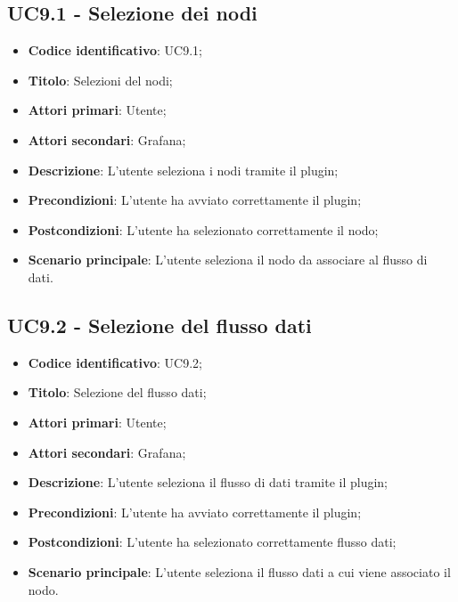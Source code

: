 \subsection{UC9.1 - Selezione dei nodi}
\begin{itemize}
	\item \textbf{Codice identificativo}: UC9.1;
	\item \textbf{Titolo}: Selezioni del nodi;
	\item \textbf{Attori primari}: Utente;
	\item \textbf{Attori secondari}: Grafana\glo;
	\item \textbf{Descrizione}: L'utente seleziona i nodi tramite il plugin;
	\item \textbf{Precondizioni}: L'utente ha avviato correttamente il plugin;
	\item \textbf{Postcondizioni}: L'utente ha selezionato correttamente il nodo;
	\item \textbf{Scenario principale}: L'utente seleziona il nodo da associare al flusso di dati.
\end{itemize}

\subsection{UC9.2 - Selezione del flusso dati}
\begin{itemize}
	\item \textbf{Codice identificativo}: UC9.2;
	\item \textbf{Titolo}: Selezione del flusso dati;
	\item \textbf{Attori primari}: Utente;
	\item \textbf{Attori secondari}: Grafana\glo;
	\item \textbf{Descrizione}: L'utente seleziona il flusso di dati tramite il plugin;
	\item \textbf{Precondizioni}: L'utente ha avviato correttamente il plugin;
	\item \textbf{Postcondizioni}: L'utente ha selezionato correttamente flusso dati;
	\item \textbf{Scenario principale}: L'utente seleziona il flusso dati a cui viene associato il nodo.
\end{itemize}

